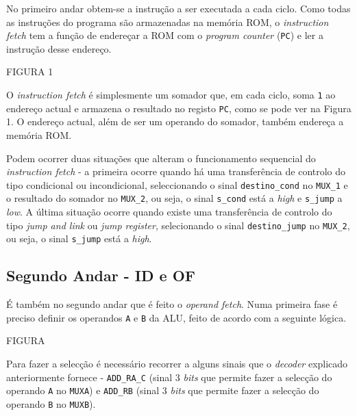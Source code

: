 \documentclass[11pt]{article}
\numberwithin{equation}{section}
\begin{document}
No primeiro andar obtem-se a instrução a ser executada a cada ciclo. Como todas as instruções do programa são armazenadas na memória ROM, o \textit{instruction fetch} tem a função de endereçar a ROM com o \textit{program counter} (\texttt{PC}) e ler a instrução desse endereço.

FIGURA 1

O \textit{instruction fetch} é simplesmente um somador que, em cada ciclo, soma \texttt{1} ao endereço actual e armazena o resultado no registo \texttt{PC}, como se pode ver na Figura 1. O endereço actual, além de ser um operando do somador, também endereça a memória ROM.

Podem ocorrer duas situações que alteram o funcionamento sequencial do \textit{instruction fetch} - a primeira ocorre quando há uma transferência de controlo do tipo condicional ou incondicional, seleccionando o sinal \texttt{destino\_cond} no \texttt{MUX\_1} e o resultado do somador no \texttt{MUX\_2}, ou seja, o sinal \texttt{s\_cond} está a \textit{high} e \texttt{s\_jump} a \textit{low}. A última situação ocorre quando existe uma transferência de controlo do tipo \textit{jump and link} ou \textit{jump register}, selecionando o sinal \texttt{destino\_jump} no \texttt{MUX\_2}, ou seja, o sinal \texttt{s\_jump} está a \textit{high}.



\subsection{Segundo Andar - ID e OF}



É também no segundo andar que é feito o \textit{operand fetch}. Numa primeira fase é preciso definir os operandos \texttt{A} e \texttt{B} da ALU, feito de acordo com a seguinte lógica.

FIGURA 

Para fazer a selecção é necessário recorrer a alguns sinais que o \textit{decoder} explicado anteriormente fornece - \texttt{ADD\_RA\_C} (sinal 3 \textit{bits} que permite fazer a selecção do operando \texttt{A} no \texttt{MUXA}) e \texttt{ADD\_RB} (sinal 3 \textit{bits} que permite fazer a selecção do operando \texttt{B} no \texttt{MUXB}). 
\end{document}
